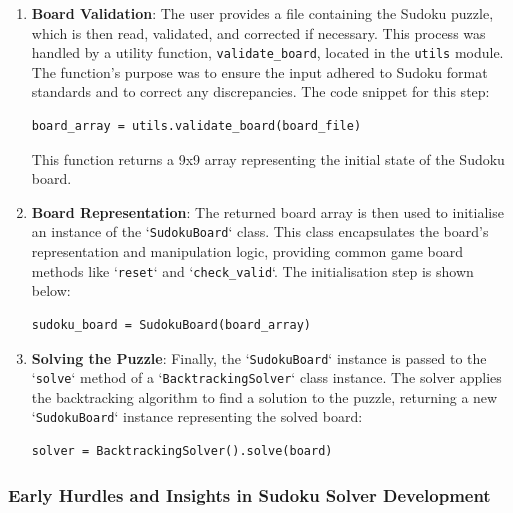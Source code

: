 \documentclass[11pt]{article}
\begin{document}
\begin{enumerate}
\item \textbf{Board Validation}: The user provides a file containing the Sudoku puzzle, which is then read, validated, and corrected if necessary. This process was handled by a utility function, \texttt{validate\_board}, located in the \texttt{utils} module. The function's purpose was to ensure the input adhered to Sudoku format standards and to correct any discrepancies. The code snippet for this step:
\begin{verbatim}
board_array = utils.validate_board(board_file)
\end{verbatim}
This function returns a 9x9 array representing the initial state of the Sudoku board.

\item \textbf{Board Representation}: The returned board array is then used to initialise an instance of the `\texttt{SudokuBoard}` class. This class encapsulates the board's representation and manipulation logic, providing common game board methods like `\texttt{reset}` and `\texttt{check\_valid}`. The initialisation step is shown below:
\begin{verbatim}
sudoku_board = SudokuBoard(board_array)
\end{verbatim}

\item \textbf{Solving the Puzzle}: Finally, the `\texttt{SudokuBoard}` instance is passed to the `\texttt{solve}` method of a `\texttt{BacktrackingSolver}` class instance. The solver applies the backtracking algorithm to find a solution to the puzzle, returning a new `\texttt{SudokuBoard}` instance representing the solved board:
\begin{verbatim}
solver = BacktrackingSolver().solve(board)
\end{verbatim}

\end{enumerate}


\subsubsection{Early Hurdles and Insights in Sudoku Solver Development}
\end{document}
